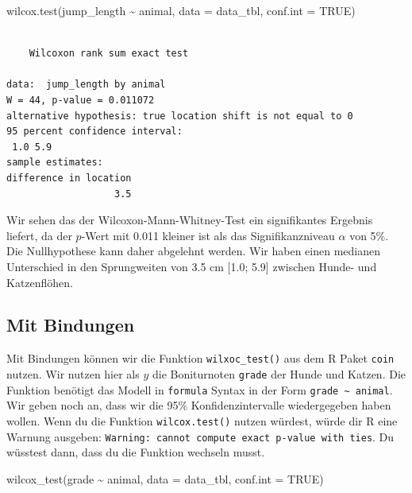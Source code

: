 \documentclass[
  letterpaper,
  DIV=11,
  oneside]{scrreport}
\newenvironment{Shaded}{\begin{snugshade}}{\end{snugshade}}
\newcommand{\AttributeTok}[1]{\textcolor[rgb]{0.40,0.45,0.13}{#1}}
\newcommand{\ConstantTok}[1]{\textcolor[rgb]{0.56,0.35,0.01}{#1}}
\newcommand{\FunctionTok}[1]{\textcolor[rgb]{0.28,0.35,0.67}{#1}}
\newcommand{\NormalTok}[1]{\textcolor[rgb]{0.00,0.23,0.31}{#1}}
\newcommand{\SpecialCharTok}[1]{\textcolor[rgb]{0.37,0.37,0.37}{#1}}
\begin{document}
\begin{Shaded}
\begin{Highlighting}[]
\FunctionTok{wilcox.test}\NormalTok{(jump\_length }\SpecialCharTok{\textasciitilde{}}\NormalTok{ animal, }\AttributeTok{data =}\NormalTok{ data\_tbl, }
            \AttributeTok{conf.int =} \ConstantTok{TRUE}\NormalTok{)}
\end{Highlighting}
\end{Shaded}

\begin{verbatim}

    Wilcoxon rank sum exact test

data:  jump_length by animal
W = 44, p-value = 0.011072
alternative hypothesis: true location shift is not equal to 0
95 percent confidence interval:
 1.0 5.9
sample estimates:
difference in location 
                   3.5 
\end{verbatim}

Wir sehen das der Wilcoxon-Mann-Whitney-Test ein signifikantes Ergebnis
liefert, da der \(p\)-Wert mit 0.011 kleiner ist als das
Signifikanzniveau \(\alpha\) von 5\%. Die Nullhypothese kann daher
abgelehnt werden. Wir haben einen medianen Unterschied in den
Sprungweiten von 3.5 cm {[}1.0; 5.9{]} zwischen Hunde- und Katzenflöhen.

\hypertarget{mit-bindungen}{%
\subsection{Mit Bindungen}\label{mit-bindungen}}

Mit Bindungen können wir die Funktion \texttt{wilxoc\_test()} aus dem R
Paket \texttt{coin} nutzen. Wir nutzen hier als \(y\) die Boniturnoten
\texttt{grade} der Hunde und Katzen. Die Funktion benötigt das Modell in
\texttt{formula} Syntax in der Form
\texttt{grade\ \textasciitilde{}\ animal}. Wir geben noch an, dass wir
die 95\% Konfidenzintervalle wiedergegeben haben wollen. Wenn du die
Funktion \texttt{wilcox.test()} nutzen würdest, würde dir R eine Warnung
ausgeben:
\texttt{Warning:\ cannot\ compute\ exact\ p-value\ with\ ties}. Du
wüsstest dann, dass du die Funktion wechseln musst.

\begin{Shaded}
\begin{Highlighting}[]
\FunctionTok{wilcox\_test}\NormalTok{(grade }\SpecialCharTok{\textasciitilde{}}\NormalTok{ animal, }\AttributeTok{data =}\NormalTok{ data\_tbl, }
            \AttributeTok{conf.int =} \ConstantTok{TRUE}\NormalTok{) }
\end{Highlighting}
\end{Shaded}
\end{document}
